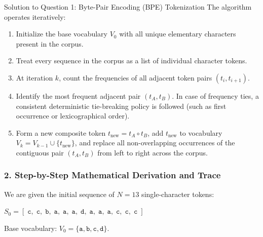 \documentclass[11pt,a4paper]{article}
\begin{document}
\begin{solutionbox}{Solution to Question 1: Byte-Pair Encoding (BPE) Tokenization}
The algorithm operates iteratively:
\begin{enumerate}[noitemsep]
    \item Initialize the base vocabulary $V_0$ with all unique elementary characters present in the corpus.
    \item Treat every sequence in the corpus as a list of individual character tokens.
    \item At iteration $k$, count the frequencies of all adjacent token pairs $(t_i, t_{i+1})$.
    \item Identify the most frequent adjacent pair $(t_A, t_B)$. In case of frequency ties, a consistent deterministic tie-breaking policy is followed (such as first occurrence or lexicographical order).
    \item Form a new composite token $t_{\text{new}} = t_A \circ t_B$, add $t_{\text{new}}$ to vocabulary $V_k = V_{k-1} \cup \{t_{\text{new}}\}$, and replace all non-overlapping occurrences of the contiguous pair $(t_A, t_B)$ from left to right across the corpus.
\end{enumerate}

\subsubsection*{2. Step-by-Step Mathematical Derivation and Trace}
We are given the initial sequence of $N = 13$ single-character tokens:
\begin{center}
$S_0 = [\;\texttt{c},\; \texttt{c},\; \texttt{b},\; \texttt{a},\; \texttt{a},\; \texttt{a},\; \texttt{d},\; \texttt{a},\; \texttt{a},\; \texttt{a},\; \texttt{c},\; \texttt{c},\; \texttt{c}\;]$
\end{center}
Base vocabulary: $V_0 = \{\texttt{a}, \texttt{b}, \texttt{c}, \texttt{d}\}$.


\end{solutionbox}
\end{document}
